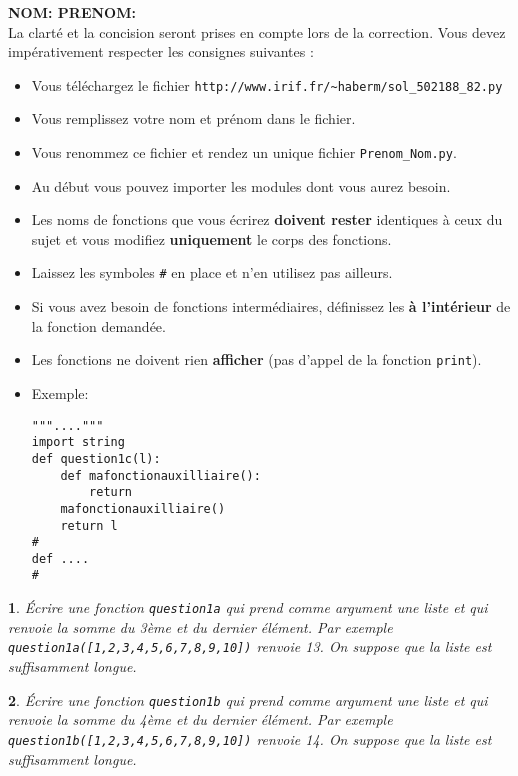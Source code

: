 \documentclass[10pt]{article}
\newtheorem{exi}{}
\newenvironment{exo}{\begin{exi}\em}{\end{exi}}
\begin{document}
\vspace*{-1cm}

\noindent
{\bf NOM: \hspace*{5cm} PRENOM:}\\
\noindent
La clarté et la concision seront prises en compte lors de la correction.
Vous devez impérativement respecter les consignes suivantes :
\begin{itemize}
\item Vous téléchargez le fichier \verb+http://www.irif.fr/~haberm/sol_502188_82.py+
        \item Vous remplissez votre nom et prénom dans le fichier.
	\item Vous renommez ce fichier et rendez un unique fichier
              {\tt Prenom\_Nom.py}. 
        \item Au début vous pouvez importer les modules dont vous aurez besoin.
	\item Les noms de fonctions que vous écrirez {\bf doivent rester}
	  identiques à ceux du sujet et vous modifiez {\bf uniquement}
          le corps des fonctions.
          \item Laissez les symboles \verb+#+ en place
          et n'en utilisez pas ailleurs.
        \item Si vous avez besoin de fonctions intermédiaires, définissez les
{\bf à l'intérieur} de la fonction demandée.
        \item Les fonctions ne doivent rien {\bf afficher} (pas d'appel de la fonction \verb+print+).
\item Exemple:
\begin{verbatim}
"""...."""
import string
def question1c(l):
    def mafonctionauxilliaire(): 
        return
    mafonctionauxilliaire() 
    return l
#
def ....
#
\end{verbatim}
\end{itemize}
\begin{exo}
    Écrire une fonction {\tt question1a} qui prend comme argument une liste et
qui renvoie la somme du 3ème et du dernier élément. Par exemple
\verb+question1a([1,2,3,4,5,6,7,8,9,10])+ renvoie 13.
On suppose que la liste est suffisamment longue.
\end{exo}
\vspace*{-2ex}
\begin{exo}
    Écrire une fonction {\tt question1b} qui prend comme argument une liste et
qui renvoie la somme du 4ème et du dernier élément. Par exemple
\verb+question1b([1,2,3,4,5,6,7,8,9,10])+ renvoie 14.
On suppose que la liste est suffisamment longue.
\end{exo}
\end{document}
